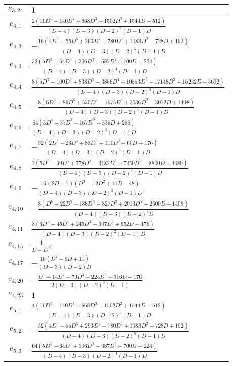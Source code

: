 \documentclass[a4paper,11pt]{article}
\begin{document}
\begin{longtable}{|c|l|}
    $e_{3, 24}$ & $1$ \\
    \hline
    $e_{4, 1}$ & $\frac{2 \left(11 D^5-140 D^4+668 D^3-1502 D^2+1544 D-512\right)}{(D-4) (D-3) (D-2)^5 (D-1) D}$ \\
    $e_{4, 2}$ & $-\frac{16 \left(4 D^6-55 D^5+293 D^4-780 D^3+1083 D^2-728 D+192\right)}{(D-4) (D-3) (D-2)^5 (D-1) D}$ \\
    $e_{4, 3}$ & $\frac{32 \left(5 D^5-64 D^4+306 D^3-687 D^2+700 D-224\right)}{(D-4) (D-3) (D-2)^4 (D-1) D}$ \\
    $e_{4, 4}$ & $\frac{8 \left(5 D^7-100 D^6+838 D^5-3856 D^4+10553 D^3-17148 D^2+15232 D-5632\right)}{(D-4) (D-3) (D-2)^5 (D-1) D}$ \\
    $e_{4, 5}$ & $-\frac{8 \left(6 D^6-89 D^5+530 D^4-1675 D^3+3036 D^2-3072 D+1408\right)}{(D-4) (D-3) (D-2)^4 (D-1) D}$ \\
    $e_{4, 6}$ & $\frac{64 \left(3 D^4-37 D^3+167 D^2-335 D+256\right)}{(D-4) (D-3) (D-2)^3 (D-1) D}$ \\
    $e_{4, 7}$ & $-\frac{32 \left(2 D^5-23 D^4+88 D^3-111 D^2-60 D+176\right)}{(D-4) (D-3) (D-2)^3 (D-1) D}$ \\
    $e_{4, 8}$ & $\frac{2 \left(5 D^6-99 D^5+778 D^4-3182 D^3+7250 D^2-8800 D+4480\right)}{(D-4) (D-3) (D-2)^4 (D-1) D}$ \\
    $e_{4, 9}$ & $-\frac{16 (2 D-7) \left(D^3-12 D^2+41 D-48\right)}{(D-4) (D-3) (D-2)^2 (D-1) D}$ \\
    $e_{4, 10}$ & $-\frac{8 \left(D^6-22 D^5+188 D^4-827 D^3+2013 D^2-2600 D+1408\right)}{(D-4) (D-3) (D-2)^4 D}$ \\
    $e_{4, 11}$ & $\frac{8 \left(3 D^5-45 D^4+245 D^3-607 D^2+652 D-176\right)}{(D-4) (D-3) (D-2)^2 (D-1) D}$ \\
    $e_{4, 15}$ & $\frac{4}{D-D^2}$ \\
    $e_{4, 17}$ & $-\frac{16 \left(D^2-6 D+11\right)}{(D-3) (D-2) D}$ \\
    $e_{4, 20}$ & $-\frac{D^5-14 D^4+79 D^3-224 D^2+316 D-170}{2 (D-3) (D-2)^3 (D-1)}$ \\
    $e_{4, 23}$ & $1$ \\
    \hline
    $e_{5, 1}$ & $\frac{4 \left(11 D^5-140 D^4+668 D^3-1502 D^2+1544 D-512\right)}{(D-4) (D-3) (D-2)^5 (D-1) D}$ \\
    $e_{5, 2}$ & $-\frac{32 \left(4 D^6-55 D^5+293 D^4-780 D^3+1083 D^2-728 D+192\right)}{(D-4) (D-3) (D-2)^5 (D-1) D}$ \\
    $e_{5, 3}$ & $\frac{64 \left(5 D^5-64 D^4+306 D^3-687 D^2+700 D-224\right)}{(D-4) (D-3) (D-2)^4 (D-1) D}$ \\

\end{longtable}
\end{document}
